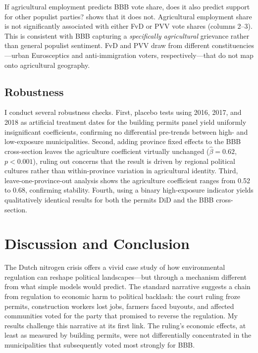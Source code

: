 \documentclass[12pt]{article}
\begin{document}


If agricultural employment predicts BBB vote share, does it also predict support for other populist parties?  shows that it does not. Agricultural employment share is not significantly associated with either FvD or PVV vote shares (columns 2--3). This is consistent with BBB capturing a \textit{specifically agricultural} grievance rather than general populist sentiment. FvD and PVV draw from different constituencies---urban Eurosceptics and anti-immigration voters, respectively---that do not map onto agricultural geography.

\subsection{Robustness}

I conduct several robustness checks. First, placebo tests using 2016, 2017, and 2018 as artificial treatment dates for the building permits panel yield uniformly insignificant coefficients, confirming no differential pre-trends between high- and low-exposure municipalities. Second, adding province fixed effects to the BBB cross-section leaves the agriculture coefficient virtually unchanged ($\hat{\beta} = 0.62$, $p < 0.001$), ruling out concerns that the result is driven by regional political cultures rather than within-province variation in agricultural identity. Third, leave-one-province-out analysis shows the agriculture coefficient ranges from 0.52 to 0.68, confirming stability. Fourth, using a binary high-exposure indicator yields qualitatively identical results for both the permits DiD and the BBB cross-section.

\section{Discussion and Conclusion}

The Dutch nitrogen crisis offers a vivid case study of how environmental regulation can reshape political landscapes---but through a mechanism different from what simple models would predict. The standard narrative suggests a chain from regulation to economic harm to political backlash: the court ruling froze permits, construction workers lost jobs, farmers faced buyouts, and affected communities voted for the party that promised to reverse the regulation. My results challenge this narrative at its first link. The ruling's economic effects, at least as measured by building permits, were not differentially concentrated in the municipalities that subsequently voted most strongly for BBB.
\end{document}
